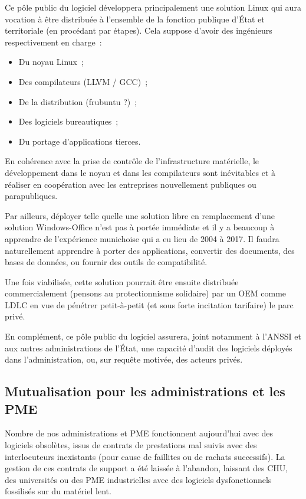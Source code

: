 \documentclass[a4paper]{article}
\begin{document}
Ce pôle public du logiciel développera principalement une solution Linux qui aura vocation à être distribuée à l’ensemble de la fonction publique d’État et territoriale (en procédant par étapes). Cela suppose d’avoir des ingénieurs respectivement en charge~:
\begin{itemize}
\item Du noyau Linux~;
\item Des compilateurs (LLVM / GCC)~;
\item De la distribution (frubuntu ?)~;
\item Des logiciels bureautiques~;
\item Du portage d’applications tierces.
\end{itemize}
En cohérence avec la prise de contrôle de l’infrastructure matérielle, le développement dans le noyau et dans les compilateurs sont inévitables et à réaliser en coopération avec les entreprises nouvellement publiques ou parapubliques.

Par ailleurs, déployer telle quelle une solution libre en remplacement d’une solution Windows-Office n’est pas à portée immédiate et il y a beaucoup à apprendre de l’expérience munichoise qui a eu lieu de 2004 à 2017. Il faudra naturellement apprendre à porter des applications, convertir des documents, des bases de données, ou fournir des outils de compatibilité.

Une fois viabilisée, cette solution pourrait être ensuite distribuée commercialement (pensons au protectionnisme solidaire) par un OEM comme LDLC en vue de pénétrer petit-à-petit (et sous forte incitation tarifaire) le parc privé.

En complément, ce pôle public du logiciel assurera, joint notamment à l’ANSSI et aux autres administrations de l’État, une capacité d’audit des logiciels déployés dans l’administration, ou, sur requête motivée, des acteurs privés.

\subsection{Mutualisation pour les administrations et les PME}
Nombre de nos administrations et PME fonctionnent aujourd’hui avec des logiciels obsolètes, issus de contrats de prestations mal suivis avec des interlocuteurs inexistants (pour cause de faillites ou de rachats successifs). La gestion de ces contrats de support a été laissée à l’abandon, laissant des CHU, des universités ou des PME industrielles avec des logiciels dysfonctionnels fossilisés sur du matériel lent. 
\end{document}
